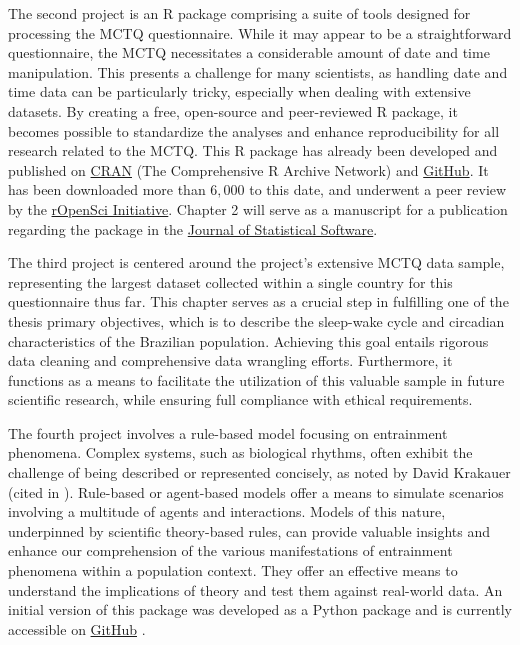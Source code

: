 \documentclass[
12pt,
openright,
oneside,
a4paper,
chapter=TITLE,
section=TITLE,
french,
spanish,
brazil,
english
]{abntex2}\usepackage{array}
\begin{document}
The second project is an R package comprising a suite of tools designed
for processing the MCTQ questionnaire. While it may appear to be a
straightforward questionnaire, the MCTQ necessitates a considerable
amount of date and time manipulation. This presents a challenge for many
scientists, as handling date and time data can be particularly tricky,
especially when dealing with extensive datasets. By creating a free,
open-source and peer-reviewed R package, it becomes possible to
standardize the analyses and enhance reproducibility for all research
related to the MCTQ. This R package \autocite{vartanian2023}has already
been developed and published on
\href{https://cran.r-project.org/web/packages/mctq/index.html}{CRAN}
(The Comprehensive R Archive Network) and
\href{https://github.com/ropensci/mctq}{GitHub}. It has been downloaded
more than \(6,000\) to this date, and underwent a peer review by the
\href{https://ropensci.org/}{rOpenSci Initiative}. Chapter 2 will serve
as a manuscript for a publication regarding the package in the
\href{https://www.jstatsoft.org/authors}{Journal of Statistical
Software}.

The third project is centered around the project's extensive MCTQ data
sample, representing the largest dataset collected within a single
country for this questionnaire thus far. This chapter serves as a
crucial step in fulfilling one of the thesis primary objectives, which
is to describe the sleep-wake cycle and circadian characteristics of the
Brazilian population. Achieving this goal entails rigorous data cleaning
and comprehensive data wrangling efforts. Furthermore, it functions as a
means to facilitate the utilization of this valuable sample in future
scientific research, while ensuring full compliance with ethical
requirements.

The fourth project involves a rule-based model focusing on entrainment
phenomena. Complex systems, such as biological rhythms, often exhibit
the challenge of being described or represented concisely, as noted by
David Krakauer (cited in \textcite{mitchell2013}). Rule-based or
agent-based models offer a means to simulate scenarios involving a
multitude of agents and interactions. Models of this nature, underpinned
by scientific theory-based rules, can provide valuable insights and
enhance our comprehension of the various manifestations of entrainment
phenomena within a population context. They offer an effective means to
understand the implications of theory and test them against real-world
data. An initial version of this package was developed as a Python
package and is currently accessible on
\href{https://entrainment.readthedocs.io/en/latest/index.html}{GitHub}
\autocite[see][]{vartanian2022}.
\end{document}
